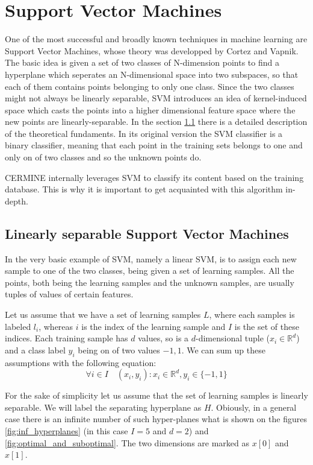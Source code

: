 \section{Support Vector Machines}\label{sec:svm}
One of the most successful and broadly known techniques in machine learning are Support Vector Machines, whose theory was developped by Cortez and Vapnik. The basic idea is given a set of two classes of N-dimension points to find a hyperplane which seperates an N-dimensional space into two subspaces, so that each of them contains points belonging to only one class. Since the two classes might not always be linearly separable, SVM introduces an idea of kernel-induced space which casts the points into a higher dimensional feature space where the new points are linearly-separable. In the section \ref{subsec:linear_svm} there is a detailed description of the theoretical fundaments. In its original version the SVM classifier is a binary classifier, meaning that each point in the training sets belongs to one and only on of two classes and so the unknown points do.

CERMINE internally leverages SVM to classify its content based on the training database. This is why it is important to get acquainted with this algorithm in-depth. 

\subsection{Linearly separable Support Vector Machines}
\label{subsec:linear_svm}
In the very basic example of SVM, namely a linear SVM, is to assign each new sample to one of the two classes, being given a set of learning samples. All the points, both being the learning samples and the unknown samples, are usually tuples of values of certain features.

Let us assume that we have a set of learning samples $L$, where each samples is labeled $l_i$, whereas $i$ is the index of the learning sample and $I$ is the set of these indices. Each training sample has $d$ values, so is a $d$-dimensional tuple ($x_i \in \mathbb{R}^d$) and a class label $y_i$ being on of two values ${-1, 1}$. We can sum up these assumptions with the following equation:
\begin{equation}
\forall{i \in I} \quad \left(x_i, y_i\right) : x_i \in \mathbb{R}^d, y_i \in \{-1, 1\}
\end{equation} 

For the sake of simplicity let us assume that the set of learning samples is linearly separable. We will label the separating hyperplane as $H$. Obiously, in a general case there is an infinite number of such hyper-planes what is shown on the figures \ref{fig:inf_hyperplanes} (in this case $I=5$ and $d=2$) and \ref{fig:optimal_and_suboptimal}. The two dimensions are marked as $x[0]$ and $x[1]$.

